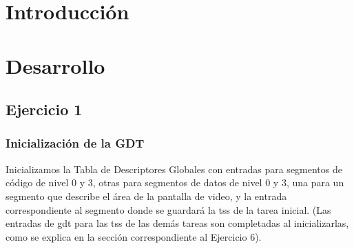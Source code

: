 \documentclass[a4paper]{article}
\begin{document}
\thispagestyle{empty}

\maketitle
\newpage

\thispagestyle{empty}
\vfill

\thispagestyle{empty}
\vspace{3cm}
\tableofcontents
\newpage

\newpage

\section{Introducción}


\newpage

\section{Desarrollo} 

\subsection{Ejercicio 1}

\subsubsection*{Inicialización de la GDT}

Inicializamos la Tabla de Descriptores Globales con entradas para segmentos de código de nivel 0 y 3, otras para segmentos de datos de nivel 0 y 3, una para un segmento que describe el área de la pantalla de video, y la entrada correspondiente al segmento donde se guardará la tss de la tarea inicial. (Las entradas de gdt para las tss de las demás tareas son completadas al inicializarlas, como se explica en la sección correspondiente al Ejercicio 6).
\end{document}
